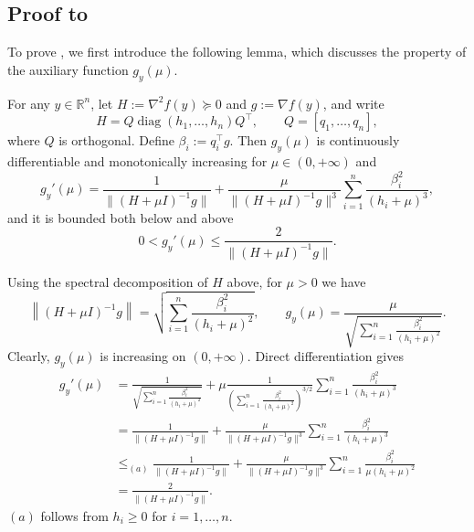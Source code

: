 \documentclass[moor,sglanonrev]{informs4}
\begin{document}
\begin{APPENDICES}
    \subsection*{Proof to }
    To prove , we first introduce the following lemma, which discusses the property of the auxiliary function $g_y(\mu)$.
    \begin{lemma}
        \label{lem.property g}
        For any $y\in \mathbb{R}^n$, let $H:=\nabla^2 f(y)\succeq0$ and $g:=\nabla f(y)$, and write
        \[
            H=Q\operatorname{diag}(h_1,\ldots,h_n)Q^\top,
            \qquad Q=[q_1,\ldots,q_n],
        \]
        where $Q$ is orthogonal. Define $\beta_i:=q_i^\top g$. Then $g_y(\mu)$ is continuously differentiable and monotonically increasing for $\mu \in \left(0,+\infty\right)$ and
        \begin{equation}
            \label{eq.derivative}
            g_y'(\mu) = \frac{1}{\|\left(H+\mu I\right)^{-1}g\|}+\frac{\mu}{\|\left(H+\mu I\right)^{-1}g\|^3}\sum_{i=1}^n\frac{\beta_i^2}{(h_i+\mu)^3},
        \end{equation}
        and it is bounded both below and above
        \begin{equation}
            \label{eq.derivative bound}
            0< g_y'(\mu) \leq \frac{2}{\|\left(H+\mu I\right)^{-1}g\|}.
        \end{equation}
    \end{lemma}
    Using the spectral decomposition of $H$ above, for $\mu>0$ we have
    \begin{equation*}
        \left\|(H+\mu I)^{-1}g\right\|=\sqrt{\sum_{i=1}^n \frac{\beta_i^2}{(h_i+\mu)^2}}, \qquad g_y(\mu) = \frac{\mu}{\sqrt{\sum_{i=1}^n \frac{\beta_i^2}{(h_i+\mu)^2}}}.
    \end{equation*}
    Clearly, $g_y(\mu)$ is increasing on $\left(0,+\infty\right)$. Direct differentiation gives
    \begin{equation*}
        \begin{aligned}
            g_y'(\mu) & = \frac{1}{\sqrt{\sum_{i=1}^n \frac{\beta_i^2}{(h_i+\mu)^2}}}+\mu \frac{1}{\left(\sum_{i=1}^n \frac{\beta_i^2}{(h_i+\mu)^2}\right)^{3/2}}\sum_{i=1}^n\frac{\beta_i^2}{(h_i+\mu)^3} \\
                      & = \frac{1}{\|(H+\mu I)^{-1}g\|}+\frac{\mu}{\|(H+\mu I)^{-1}g\|^3}\sum_{i=1}^n\frac{\beta_i^2}{(h_i+\mu)^3} \\
                      & \leq_{(a)} \frac{1}{\|(H+\mu I)^{-1}g\|}+\frac{\mu}{\|(H+\mu I)^{-1}g\|^3}\sum_{i=1}^n\frac{\beta_i^2}{\mu(h_i+\mu)^2} \\
                      & = \frac{2}{\|(H+\mu I)^{-1}g\|}.
        \end{aligned}
    \end{equation*}
    $(a)$ follows from $h_i\geq0$ for $i=1,\ldots,n$.
    \Halmos \endproof


\end{APPENDICES}
\end{document}
